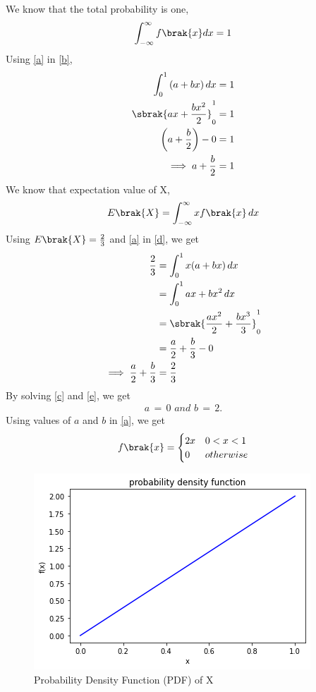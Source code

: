
We know that the total probability is one,
\begin{equation}
    \int_{-\infty}^{\infty}{f\brak{x} dx} = 1\label{b}
\end{equation}
Using \eqref{a} in \eqref{b},
\begin{align}
    \int_{0}^{1}{(a+bx)\,dx} = 1\\
    \sbrak{ax+\frac{bx^2}{2}}_0^1=1\\
    \left(a+\frac{b}{2}\right)-0=1\\
    \implies a+\frac{b}{2}=1 \label{c}
\end{align}
We know that expectation value of X,
\begin{align}
    E\brak{X}=\int_{-\infty}^{\infty}xf\brak{x}\,dx\label{d}
\end{align}
%
Using $E\brak{X}=\frac{2}{3}$ and \eqref{a} in \eqref{d}, we get
\begin{align}
     \frac{2}{3}&=\int_{0}^{1}x(a+bx)\,dx\\
     &=\int_{0}^{1} ax+bx^2\,dx\\
     &= \sbrak{\frac{ax^2}{2}+\frac{bx^3}{3}}_0^1\\
     &= \frac{a}{2}+\frac{b}{3}-0\\
     \implies\frac{a}{2}+\frac{b}{3}&=\frac{2}{3}\label{e}
\end{align}
By solving \eqref{c} and \eqref{e}, we get 
\begin{align}
    a\, =\, 0 \,\,and\,\, b\, =\, 2.
\end{align}
Using values of $a$ and $b$ in \eqref{a}, we get
\begin{align}
f\brak{x}
= 
\begin{cases}
2x & 0<x<1
\\
0 & otherwise\label{f}\\
\end{cases}
\end{align}
\begin{figure}[ht]
    \centering
    \includegraphics[width=\columnwidth]{solutions/ec/15/figures/assign2.png}
    \caption{Probability Density Function (PDF) of X}
    \label{Figure_1}
\end{figure}
